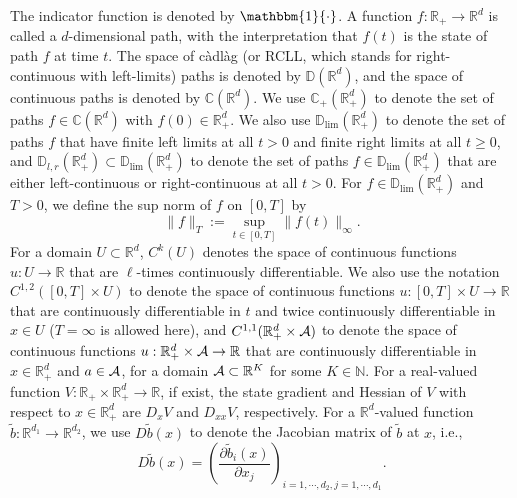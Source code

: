 \documentclass[11pt]{article}
\theoremstyle{definition}
\theoremstyle{plain}
\newcommand{\R}{\mathbb{R}}
\newcommand{\N}{\mathbb{N}}
\newcommand{\C}{\mathbb{C}}
\newcommand{\D}{\mathbb{D}}
\newcommand{\cA}{{\cal A}}
\newcommand{\tb}{\tilde{b}}
\newcommand{\mbOne}{\mathbbm{1}}
\begin{document}
The indicator function is denoted by $\mbOne\{\cdot\}$. 
A function $f: \R_+ \to \R^d$ is called a $d$-dimensional path, with the interpretation that $f(t)$ is the state of path $f$ at time $t$. 
The space of c\`adl\`ag (or RCLL, which stands for right-continuous with left-limits) paths is denoted by $\D(\R^d)$, 
and the space of continuous paths is denoted by $\C(\R^d)$. 
We use $\C_+(\R_+^d)$ to denote the set of paths $f \in \C(\R^d)$ with $f(0) \in \R_+^d$. 
We also use $\D_{\text{lim}}(\R_+^d)$ to denote the set of paths $f$ that have finite left limits at all $t>0$ 
and finite right limits at all $t\geq 0$, and $\D_{l,r}(\R_+^d) \subset \D_{\text{lim}}(\R_+^d)$ 
to denote the set of paths $f \in \D_{\text{lim}}(\R_+^d)$ that are either left-continuous or right-continuous at all $t>0$. 
For $f \in \D_{\text{lim}}(\R_+^d)$ and $T > 0$, we define the sup norm of $f$ on $[0,T]$ by
\begin{equation}\label{eq:sup-norm}
  \|f\|_T := \sup_{t\in [0,T]} \|f(t)\|_\infty.
\end{equation}
For a domain $U \subset \R^d$, $C^k(U)$ denotes the space of continuous functions $u : U \to \R$ that are $\ell$-times continuously differentiable. 
We also use the notation $C^{1,2}([0,T]\times U)$ to denote the space of continuous functions $u : [0,T] \times U \to \R$ that are continuously differentiable in $t$ and twice continuously differentiable in $x\in U$ 
($T = \infty$ is allowed here), 
and $C^{1,1}(\R_+^d \times \cA)$ to denote the space of continuous functions $u : \R_+^d \times \cA \to \R$ that are continuously differentiable in $x\in \R_+^d$ and $a\in \cA$, 
for a domain $\cA \subset \R^K$ for some $K \in \N$. 
For a real-valued function $V: \R_+ \times \R_+^d \to \R$, if exist, the state gradient and Hessian of $V$ with respect to $x\in \R_+^d$ are $D_x V$ and $D_{xx} V$, respectively. 
For a $\R^d$-valued function $\tb: \R^{d_1} \to \R^{d_2}$, we use $D\tb(x)$ to denote the Jacobian matrix of $\tb$ at $x$, 
i.e., 
\[
D\tb(x) = \left( \frac{\partial \tb_i(x)}{\partial x_j} \right)_{i=1,\cdots,d_2, j=1,\cdots,d_1}.
\]
\end{document}
